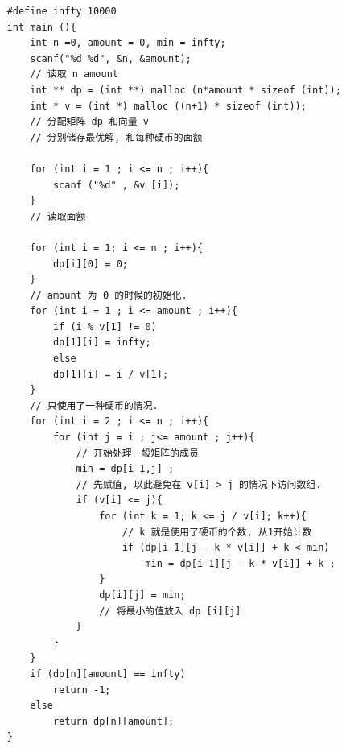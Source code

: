 \documentclass[a4paper, 10pt]{ctexart} %
\begin{document}
\begin{verbatim}
    #define infty 10000
    int main (){
        int n =0, amount = 0, min = infty;
        scanf("%d %d", &n, &amount);
        // 读取 n amount
        int ** dp = (int **) malloc (n*amount * sizeof (int));
        int * v = (int *) malloc ((n+1) * sizeof (int));
        // 分配矩阵 dp 和向量 v
        // 分别储存最优解, 和每种硬币的面额

        for (int i = 1 ; i <= n ; i++){
            scanf ("%d" , &v [i]);
        }
        // 读取面额

        for (int i = 1; i <= n ; i++){
            dp[i][0] = 0;
        }
        // amount 为 0 的时候的初始化. 
        for (int i = 1 ; i <= amount ; i++){
            if (i % v[1] != 0)
            dp[1][i] = infty;
            else 
            dp[1][i] = i / v[1];
        }
        // 只使用了一种硬币的情况. 
        for (int i = 2 ; i <= n ; i++){
            for (int j = i ; j<= amount ; j++){
                // 开始处理一般矩阵的成员
                min = dp[i-1,j] ;
                // 先赋值, 以此避免在 v[i] > j 的情况下访问数组. 
                if (v[i] <= j){
                    for (int k = 1; k <= j / v[i]; k++){
                        // k 就是使用了硬币的个数, 从1开始计数
                        if (dp[i-1][j - k * v[i]] + k < min)
                            min = dp[i-1][j - k * v[i]] + k ;
                    }
                    dp[i][j] = min;
                    // 将最小的值放入 dp [i][j]
                }
            }
        }
        if (dp[n][amount] == infty)
            return -1;
        else 
            return dp[n][amount];
    }
\end{verbatim}
\end{document}
